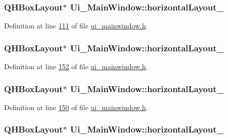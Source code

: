 \hypertarget{a00027_a9ab91d59aada4ff82309b36c9d5a0fa6}{
\subsubsection[{horizontal\+Layout\+\_\+16}]{\setlength{\rightskip}{0pt plus 5cm}Q\+H\+Box\+Layout$\ast$ Ui\+\_\+\+Main\+Window\+::horizontal\+Layout\+\_}}\label{a00027_a9ab91d59aada4ff82309b36c9d5a0fa6}


Definition at line \hyperlink{a00052_source_l00111}{111} of file \hyperlink{a00052_source}{ui\+\_\+mainwindow.\+h}.

\hypertarget{a00027_a8cfe172f7719cf363fc630c536cad6c3}{
\subsubsection[{horizontal\+Layout\+\_\+17}]{\setlength{\rightskip}{0pt plus 5cm}Q\+H\+Box\+Layout$\ast$ Ui\+\_\+\+Main\+Window\+::horizontal\+Layout\+\_}}\label{a00027_a8cfe172f7719cf363fc630c536cad6c3}


Definition at line \hyperlink{a00052_source_l00152}{152} of file \hyperlink{a00052_source}{ui\+\_\+mainwindow.\+h}.

\hypertarget{a00027_a49a16c34d46bb0d66edb10c3b92b226c}{
\subsubsection[{horizontal\+Layout\+\_\+18}]{\setlength{\rightskip}{0pt plus 5cm}Q\+H\+Box\+Layout$\ast$ Ui\+\_\+\+Main\+Window\+::horizontal\+Layout\+\_}}\label{a00027_a49a16c34d46bb0d66edb10c3b92b226c}


Definition at line \hyperlink{a00052_source_l00150}{150} of file \hyperlink{a00052_source}{ui\+\_\+mainwindow.\+h}.

\hypertarget{a00027_a5a19bc8cf16dd2fbfa87ddaec41e2d75}{
\subsubsection[{horizontal\+Layout\+\_\+19}]{\setlength{\rightskip}{0pt plus 5cm}Q\+H\+Box\+Layout$\ast$ Ui\+\_\+\+Main\+Window\+::horizontal\+Layout\+\_}}\label{a00027_a5a19bc8cf16dd2fbfa87ddaec41e2d75}


